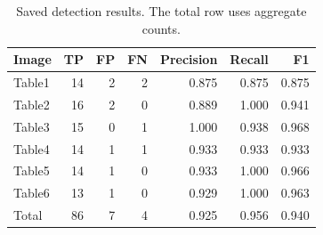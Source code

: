 \begin{table}[htbp]
\centering
\caption{Saved detection results. The total row uses aggregate counts.}
\label{tab:detection}
\begin{tabular}{lrrrrrr}
\toprule
Image & TP & FP & FN & Precision & Recall & F1 \\
\midrule
Table1 & 14 & 2 & 2 & 0.875 & 0.875 & 0.875 \\
Table2 & 16 & 2 & 0 & 0.889 & 1.000 & 0.941 \\
Table3 & 15 & 0 & 1 & 1.000 & 0.938 & 0.968 \\
Table4 & 14 & 1 & 1 & 0.933 & 0.933 & 0.933 \\
Table5 & 14 & 1 & 0 & 0.933 & 1.000 & 0.966 \\
Table6 & 13 & 1 & 0 & 0.929 & 1.000 & 0.963 \\
\midrule
Total & 86 & 7 & 4 & 0.925 & 0.956 & 0.940 \\
\bottomrule
\end{tabular}
\end{table}
